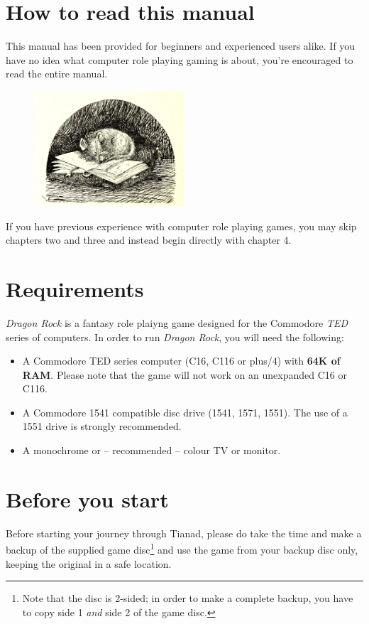 \documentclass[12pt]{scrbook}
\begin{document}
\section*{How to read this manual}

This manual has been provided for beginners and experienced users alike. If you have no idea what computer role playing gaming is about, you're encouraged to read the entire manual. 

\begin{figure}[ht]
    \centering
    \includegraphics[width=0.5\textwidth]{illustrations/dormouse.jpg}
\end{figure}

If you have previous experience with computer role playing games, you may skip chapters two and three and instead begin directly with chapter 4. 


\section*{Requirements}
\textit{Dragon Rock} is a fantasy role plaiyng game designed for the Commodore \textit{TED} series of computers. In order to run \textit{Dragon Rock}, you will need the following:
\begin{itemize}
    \item A Commodore TED series computer (C16, C116 or plus/4) with \textbf{64K of RAM}. Please note that the game will not work on an unexpanded C16 or C116.
    \item A Commodore 1541 compatible disc drive (1541, 1571, 1551). The use of a 1551 drive is strongly recommended.
    \item A monochrome or -- recommended -- colour TV or monitor.
\end{itemize}

\section*{Before you start}
Before starting your journey through Tianad, please do take the time and make a backup of the supplied game disc\footnote{Note that the disc is 2-sided; in order to make a complete backup, you have to copy side 1 \textit{and} side 2 of the game disc.} and use the game from your backup disc only, keeping the original in a safe location.
\end{document}

